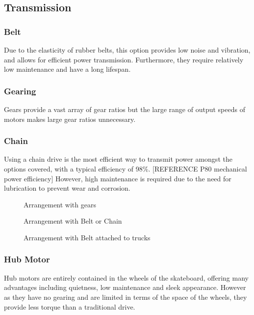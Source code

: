 \documentclass[journal,10pt]{IEEEtran}
\begin{document}
    \subsection{Transmission}
        \subsubsection{Belt}
            Due to the elasticity of rubber belts, this option provides low noise and vibration, and allows for efficient power transmission. Furthermore, they require relatively low maintenance and have a long lifespan. 
        \subsubsection{Gearing}
            Gears provide a vast array of gear ratios but the large range of output speeds of motors makes large gear ratios unnecessary.
        \subsubsection{Chain}
            Using a chain drive is the most efficient way to transmit power amongst the options covered, with a typical efficiency of 98\%. [REFERENCE P80 mechanical power efficiency] However, high maintenance is required due to the need for lubrication to prevent wear and corrosion. 
        \begin{figure}[H]
            \centering
            \caption{Arrangement with gears}
            \label{fig:Drivetrain1}
        \end{figure}
        \begin{figure}[H]
            \centering
            \caption{Arrangement with Belt or Chain}
            \label{fig:Drivetrain2}
        \end{figure}
        \begin{figure}[H]
            \centering
            \caption{Arrangement with Belt attached to trucks}
            \label{fig:Drivetrain3}
        \end{figure}
        \subsubsection{Hub Motor}
            Hub motors are entirely contained in the wheels of the skateboard, offering many advantages including quietness, low maintenance and sleek appearance.
            However as they have no gearing and are limited in terms of the space of the wheels, they provide less torque than a traditional drive. %
\end{document}
